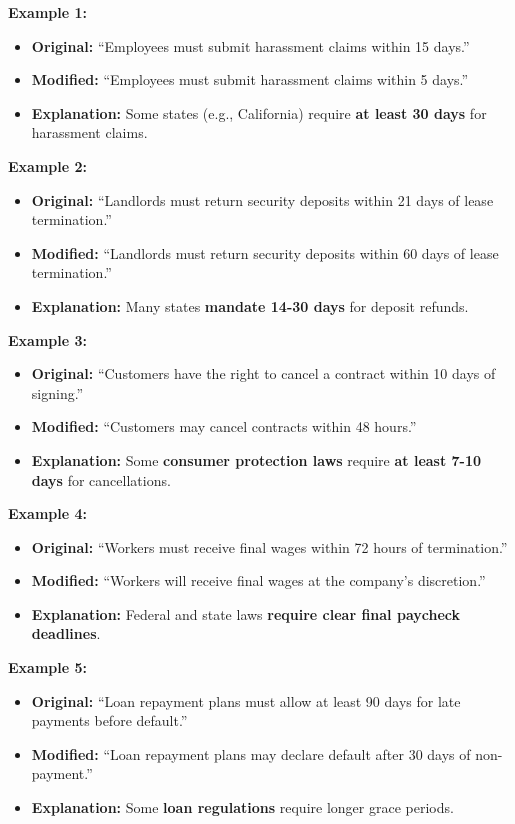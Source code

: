 \documentclass[11pt]{article}
\begin{document}
\begin{tcolorbox}[breakable,colback=lightestgray,colframe=black,title=\textbf{Inconsistency Legal Data Generation Prompt}]
\textbf{Example 1:}
\begin{itemize}
    \item \textbf{Original:} ``Employees must submit harassment claims within 15 days.''
    \item \textbf{Modified:} ``Employees must submit harassment claims within 5 days.''
    \item \textbf{Explanation:} Some states (e.g., California) require \textbf{at least 30 days} for harassment claims.
\end{itemize}

\textbf{Example 2:}
\begin{itemize}
    \item \textbf{Original:} ``Landlords must return security deposits within 21 days of lease termination.''
    \item \textbf{Modified:} ``Landlords must return security deposits within 60 days of lease termination.''
    \item \textbf{Explanation:} Many states \textbf{mandate 14-30 days} for deposit refunds.
\end{itemize}

\textbf{Example 3:}
\begin{itemize}
    \item \textbf{Original:} ``Customers have the right to cancel a contract within 10 days of signing.''
    \item \textbf{Modified:} ``Customers may cancel contracts within 48 hours.''
    \item \textbf{Explanation:} Some \textbf{consumer protection laws} require \textbf{at least 7-10 days} for cancellations.
\end{itemize}

\textbf{Example 4:}
\begin{itemize}
    \item \textbf{Original:} ``Workers must receive final wages within 72 hours of termination.''
    \item \textbf{Modified:} ``Workers will receive final wages at the company's discretion.''
    \item \textbf{Explanation:} Federal and state laws \textbf{require clear final paycheck deadlines}.
\end{itemize}

\textbf{Example 5:}
\begin{itemize}
    \item \textbf{Original:} ``Loan repayment plans must allow at least 90 days for late payments before default.''
    \item \textbf{Modified:} ``Loan repayment plans may declare default after 30 days of non-payment.''
    \item \textbf{Explanation:} Some \textbf{loan regulations} require longer grace periods.
\end{itemize}


\end{tcolorbox}
\end{document}
